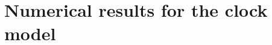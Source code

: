\documentclass[9pt, ebook, openany, oneside]{memoir}
\begin{document}
\chapter{Numerical results for the clock model}


\appendix
% 
%
% 

% 


\backmatter
\printbibliography
\end{document}
